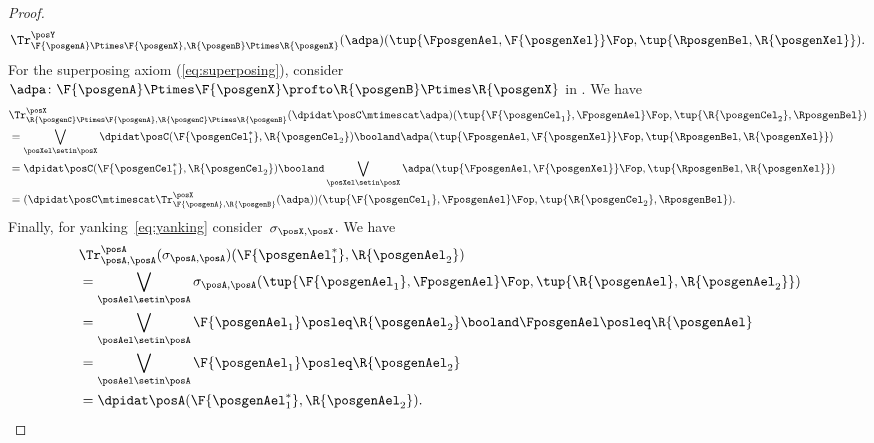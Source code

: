 \begin{proof}
\begin{equation}
\begin{aligned}
{                    \Tr_{\F{\posgenA}\Ptimes \F{\posgenX},\R{\posgenB}\Ptimes \R{\posgenX}}^\posY(\adpa)(\tup{\FposgenAel,\F{\posgenXel}}\Fop, \tup{\RposgenBel,\R{\posgenXel}})}.
            \end{aligned}
        \end{equation}
        For the superposing axiom (\cref{eq:superposing}), consider~$\adpa\colon \F{\posgenA}\Ptimes \F{\posgenX}\profto \R{\posgenB}\Ptimes \R{\posgenX}$ in \DP.
        We have
        \begin{equation}
            \begin{aligned}
                {}
                 & \Tr_{\R{\posgenC}\Ptimes \F{\posgenA},\R{\posgenC}\Ptimes \R{\posgenB}}^{\posX}(\dpidat\posC\mtimescat \adpa)(\tup{\F{\posgenCel_1},\FposgenAel}\Fop, \tup{\R{\posgenCel_2},\RposgenBel}) \\
                 & = \bigvee_{\posXel \setin \posX} \dpidat\posC(\F{\posgenCel_1^*},\R{\posgenCel_2})\booland \adpa(\tup{\FposgenAel,\F{\posgenXel}}\Fop, \tup{\RposgenBel,\R{\posgenXel}}) \\
                 & =\dpidat\posC(\F{\posgenCel_1^*},\R{\posgenCel_2}) \booland \bigvee_{\posXel\setin \posX} \adpa(\tup{\FposgenAel,\F{\posgenXel}}\Fop, \tup{\RposgenBel,\R{\posgenXel}}) \\
                 & =(\dpidat\posC \mtimescat \Tr_{\F{\posgenA},\R{\posgenB}}^\posX(\adpa))(\tup{\F{\posgenCel_1},\FposgenAel}\Fop, \tup{\R{\posgenCel_2},\RposgenBel}).
            \end{aligned}
        \end{equation}
        Finally, for yanking~\cref{eq:yanking} consider~$\sigma_{\posX,\posX}$.
        We have
        \begin{equation}
            \begin{aligned}
                ~ & \Tr_{\posA,\posA}^{\posA}(\sigma_{\posA,\posA})(\F{\posgenAel_1^*},\R{\posgenAel_2}) \\
                  & = \bigvee_{\posAel\setin \posA} \sigma_{\posA,\posA}(\tup{\F{\posgenAel_1},\FposgenAel}\Fop, \tup{\R{\posgenAel},\R{\posgenAel_2}}) \\
                  & =\bigvee_{\posAel\setin \posA} \F{\posgenAel_1} \posleq \R{\posgenAel_2} \booland \FposgenAel\posleq \R{\posgenAel} \\
                  & =\bigvee_{\posAel\setin \posA} \F{\posgenAel_1} \posleq \R{\posgenAel_2} \\
                  & =\dpidat\posA(\F{\posgenAel_1^*},\R{\posgenAel_2}).
            \end{aligned}
        \end{equation}
    \end{proof}




